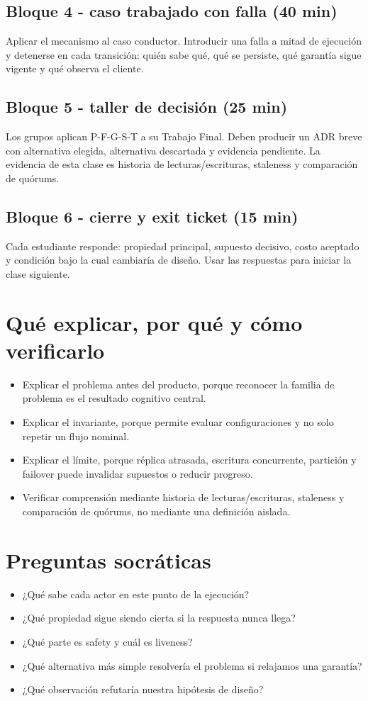 \documentclass[variant=docente,cover=institutional,mode=screen]{ua-engineering-v6-article}
\begin{document}
\subsection*{Bloque 4 - caso trabajado con falla (40 min)}
Aplicar el mecanismo al caso conductor. Introducir una falla a mitad de ejecución y detenerse en cada transición: quién sabe qué, qué se persiste, qué garantía sigue vigente y qué observa el cliente.

\subsection*{Bloque 5 - taller de decisión (25 min)}
Los grupos aplican P-F-G-S-T a su Trabajo Final. Deben producir un ADR breve con alternativa elegida, alternativa descartada y evidencia pendiente. La evidencia de esta clase es historia de lecturas/escrituras, staleness y comparación de quórums.

\subsection*{Bloque 6 - cierre y exit ticket (15 min)}
Cada estudiante responde: propiedad principal, supuesto decisivo, costo aceptado y condición bajo la cual cambiaría de diseño. Usar las respuestas para iniciar la clase siguiente.

\section{Qué explicar, por qué y cómo verificarlo}
\begin{itemize}
\item Explicar el problema antes del producto, porque reconocer la familia de problema es el resultado cognitivo central.
\item Explicar el invariante, porque permite evaluar configuraciones y no solo repetir un flujo nominal.
\item Explicar el límite, porque réplica atrasada, escritura concurrente, partición y failover puede invalidar supuestos o reducir progreso.
\item Verificar comprensión mediante historia de lecturas/escrituras, staleness y comparación de quórums, no mediante una definición aislada.
\end{itemize}

\section{Preguntas socráticas}
\begin{itemize}
\item ¿Qué sabe cada actor en este punto de la ejecución?
\item ¿Qué propiedad sigue siendo cierta si la respuesta nunca llega?
\item ¿Qué parte es safety y cuál es liveness?
\item ¿Qué alternativa más simple resolvería el problema si relajamos una garantía?
\item ¿Qué observación refutaría nuestra hipótesis de diseño?
\end{itemize}
\end{document}
